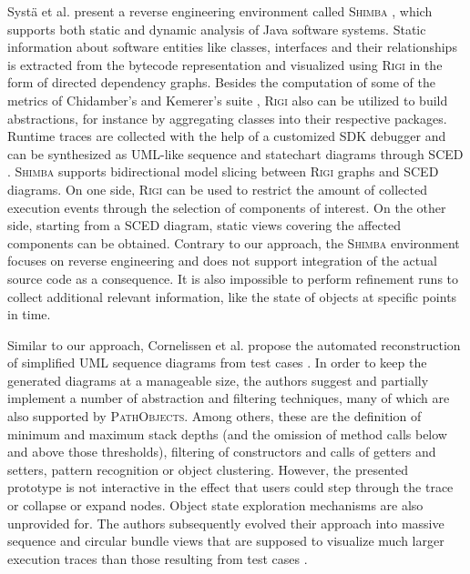 Systä et al. present a reverse engineering environment called \textsc{Shimba} \cite{systa_shimba_2001}, which supports both static and dynamic analysis of Java software systems.
Static information about software entities like classes, interfaces and their relationships is extracted from the bytecode representation and visualized using \textsc{Rigi} \cite{muller_understanding_1993} in the form of directed dependency graphs.
Besides the computation of some of the metrics of Chidamber's and Kemerer's suite \cite{chidamber_metrics_1994}, \textsc{Rigi} also can be utilized to build abstractions, for instance by aggregating classes into their respective packages.
Runtime traces are collected with the help of a customized SDK debugger and can be synthesized as UML-like sequence and statechart diagrams through \textsc{SCED} \cite{koskimies_automated_1998,systa_understanding_2000}.
\textsc{Shimba} supports bidirectional model slicing between \textsc{Rigi} graphs and \textsc{SCED} diagrams.
On one side, \textsc{Rigi} can be used to restrict the amount of collected execution events through the selection of components of interest.
On the other side, starting from a \textsc{SCED} diagram, static views covering the affected components can be obtained.
Contrary to our approach, the \textsc{Shimba} environment focuses on reverse engineering and does not support integration of the actual source code as a consequence.
It is also impossible to perform refinement runs to collect additional relevant information, like the state of objects at specific points in time.

Similar to our approach, Cornelissen et al. propose the automated reconstruction of simplified UML sequence diagrams from test cases \cite{cornelissen_visualizing_2007}.
In order to keep the generated diagrams at a manageable size, the authors suggest and partially implement a number of abstraction and filtering techniques, many of which are also supported by \textsc{PathObjects}.
Among others, these are the definition of minimum and maximum stack depths (and the omission of method calls below and above those thresholds), filtering of constructors and calls of getters and setters, pattern recognition or object clustering.
However, the presented prototype is not interactive in the effect that users could step through the trace or collapse or expand nodes.
Object state exploration mechanisms are also unprovided for.
The authors subsequently evolved their approach into massive sequence and circular bundle views that are supposed to visualize much larger execution traces than those resulting from test cases \cite{cornelissen_understanding_2007, cornelissen_execution_2008}.

